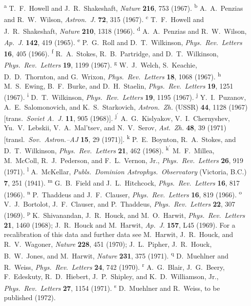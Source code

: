 \begingroup
\small
\setlength{\parindent}{0pt}
\textsuperscript{a} T.~F.~Howell and J.~R.~Shakeshaft, \emph{Nature}
\textbf{216}, 753 (1967).
\textsuperscript{b} A.~A.~Penzias and R.~W.~Wilson, \emph{Astron.\ J.}
\textbf{72}, 315 (1967).
\textsuperscript{c} T.~F.~Howell and J.~R.~Shakeshaft, \emph{Nature}
\textbf{210}, 1318 (1966).
\textsuperscript{d} A.~A.~Penzias and R.~W.~Wilson, \emph{Ap.\ J.}
\textbf{142}, 419 (1965).
\textsuperscript{e} P.~G.~Roll and D.~T.~Wilkinson, \emph{Phys.\ Rev.\
Letters} \textbf{16}, 405 (1966).
\textsuperscript{f} R.~A.~Stokes, R.~B.~Partridge, and D.~T.~Wilkinson,
\emph{Phys.\ Rev.\ Letters} \textbf{19}, 1199 (1967).
\textsuperscript{g} W.~J.~Welch, S.~Keachie, D.~D.~Thornton, and G.~Wrixon,
\emph{Phys.\ Rev.\ Letters} \textbf{18}, 1068 (1967).
\textsuperscript{h} M.~S.~Ewing, B.~F.~Burke, and D.~H.~Staelin,
\emph{Phys.\ Rev.\ Letters} \textbf{19}, 1251 (1967).
\textsuperscript{i} D.~T.~Wilkinson, \emph{Phys.\ Rev.\ Letters} \textbf{19},
1195 (1967).
\textsuperscript{j} Y.~I.~Puzanov, A.~E.~Salomonovich, and K.~S.~Starkovich,
\emph{Astron.\ Zh.} (USSR) \textbf{44}, 1128 (1967) [trans.\
\emph{Soviet A.\ J.} \textbf{11}, 905 (1968)].
\textsuperscript{j\(^{\prime}\)} A.~G.~Kislyakov, V.~I.~Chernyshev,
Yu.~V.~Lebskii, V.~A.~Mal'tsev, and N.~V.~Serov, \emph{Ast.\ Zh.}
\textbf{48}, 39 (1971) [transl.\ \emph{Sov.\ Astron.--AJ} \textbf{15}, 29
(1971)].
\textsuperscript{k} P.~E.~Boynton, R.~A.~Stokes, and D.~T.~Wilkinson,
\emph{Phys.\ Rev.\ Letters} \textbf{21}, 462 (1968).
\textsuperscript{k\(^{\prime}\)} M.~F.~Millea, M.~McColl, R.~J.~Pederson,
and F.~L.~Vernon, Jr., \emph{Phys.\ Rev.\ Letters} \textbf{26}, 919 (1971).
\textsuperscript{l} A.~McKellar, \emph{Publs.\ Dominion Astrophys.\
Observatory} (Victoria, B.C.) \textbf{7}, 251 (1941).
\textsuperscript{m} G.~B.~Field and J.~L.~Hitchcock, \emph{Phys.\ Rev.\
Letters} \textbf{16}, 817 (1966).
\textsuperscript{n} P.~Thaddeus and J.~F.~Clauser, \emph{Phys.\ Rev.\
Letters} \textbf{16}, 819 (1966).
\textsuperscript{o} V.~J.~Bortolot, J.~F.~Clauser, and P.~Thaddeus,
\emph{Phys.\ Rev.\ Letters} \textbf{22}, 307 (1969).
\textsuperscript{p} K.~Shivanandan, J.~R.~Houck, and M.~O.~Harwit,
\emph{Phys.\ Rev.\ Letters} \textbf{21}, 1460 (1968); J.~R.~Houck and
M.~Harwit, \emph{Ap.\ J.} \textbf{157}, L45 (1969). For a recalibration of
this data and further data see M.~Harwit, J.~R.~Houck, and R.~V.~Wagoner,
\emph{Nature} \textbf{228}, 451 (1970); J.~L.~Pipher, J.~R.~Houck,
B.~W.~Jones, and M.~Harwit, \emph{Nature} \textbf{231}, 375 (1971).
\textsuperscript{q} D.~Muehlner and R.~Weiss, \emph{Phys.\ Rev.\ Letters}
\textbf{24}, 742 (1970).
\textsuperscript{r} A.~G.~Blair, J.~G.~Beery, F.~Edeskuty, R.~D.~Hiebert,
J.~P.~Shipley, and K.~D.~Williamson, Jr., \emph{Phys.\ Rev.\ Letters}
\textbf{27}, 1154 (1971).
\textsuperscript{s} D.~Muehlner and R.~Weiss, to be published (1972).
\endgroup

